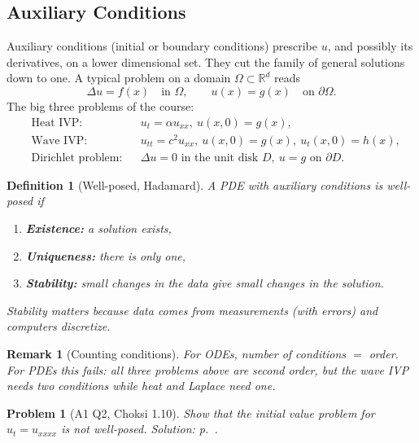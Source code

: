 \documentclass{article}
\newtheorem{definition}{Definition}
\newtheorem{problem}{Problem}
\newtheorem{remark}{Remark}
\begin{document}
\subsection{Auxiliary Conditions}
Auxiliary conditions (initial or boundary conditions) prescribe $u$, and possibly its derivatives, on a lower dimensional set. They cut the family of general solutions down to one. A typical problem on a domain $\Omega \subset \mathbb{R}^d$ reads
\begin{equation}
    \Delta u = f(x) \quad \text{in } \Omega,
    \qquad
    u(x) = g(x) \quad \text{on } \partial\Omega .
\end{equation}
The big three problems of the course:
\begin{align}
    &\text{Heat IVP:} && u_t = \alpha u_{xx},\ u(x,0) = g(x), \\
    &\text{Wave IVP:} && u_{tt} = c^2 u_{xx},\ u(x,0) = g(x),\ u_t(x,0) = h(x), \\
    &\text{Dirichlet problem:} && \Delta u = 0 \text{ in the unit disk } D,\ u = g \text{ on } \partial D.
\end{align}
\begin{definition}[Well-posed, Hadamard]
    A PDE with auxiliary conditions is well-posed if
    \begin{enumerate}[label=(\arabic*)]
        \item \textbf{Existence:} a solution exists,
        \item \textbf{Uniqueness:} there is only one,
        \item \textbf{Stability:} small changes in the data give small changes in the solution.
    \end{enumerate}
    Stability matters because data comes from measurements (with errors) and computers discretize.
\end{definition}
\begin{remark}[Counting conditions]
    For ODEs, number of conditions $=$ order. For PDEs this fails: all three problems above are second order, but the wave IVP needs two conditions while heat and Laplace need one.
\end{remark}

\begin{problem}[A1 Q2, Choksi 1.10]\label{prob:a1-110}
    Show that the initial value problem for $u_t = u_{xxxx}$ is not well-posed.
    \hfill \emph{Solution: p.~\pageref{sol:a1-110}.}
\end{problem}
\end{document}
